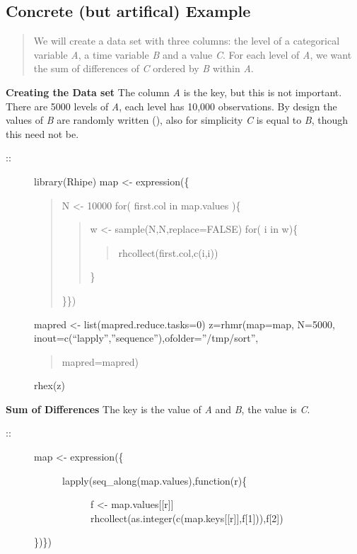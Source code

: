 \documentclass[letterpaper,10pt,english]{sphinxmanual}
\begin{document}
\subsection{Concrete (but artifical) Example}
\label{airline:concrete-but-artifical-example}\begin{quote}

We will create a data set with three columns: the level of a categorical variable \emph{A}, a time variable \emph{B} and a value \emph{C}. For each level of \emph{A}, we want the sum of differences of \emph{C} ordered by \emph{B} within \emph{A}.
\end{quote}

\textbf{Creating the Data set} The column \emph{A} is the key, but this is not important. There are 5000 levels of \emph{A}, each level has 10,000 observations. By design the values of \emph{B} are randomly written (), also for simplicity \emph{C} is equal to \emph{B}, though this need not be.
\begin{description}
\item[{::}] \leavevmode
library(Rhipe)
map \textless{}- expression(\{
\begin{quote}

N \textless{}- 10000
for( first.col in map.values )\{
\begin{quote}

w \textless{}- sample(N,N,replace=FALSE)
for( i in w)\{
\begin{quote}

rhcollect(first.col,c(i,i))
\end{quote}

\}
\end{quote}

\}\})
\end{quote}

mapred \textless{}- list(mapred.reduce.tasks=0)
z=rhmr(map=map, N=5000, inout=c(``lapply'',''sequence''),ofolder=''/tmp/sort'',
\begin{quote}

mapred=mapred)
\end{quote}

rhex(z)

\end{description}

\textbf{Sum of Differences}
The key is the value of \emph{A} and \emph{B}, the value is \emph{C}.
\begin{description}
\item[{::}] \leavevmode\begin{description}
\item[{map \textless{}- expression(\{}] \leavevmode\begin{description}
\item[{lapply(seq\_along(map.values),function(r)\{}] \leavevmode
f \textless{}- map.values{[}{[}r{]}{]}
rhcollect(as.integer(c(map.keys{[}{[}r{]}{]},f{[}1{]})),f{[}2{]})

\end{description}

\end{description}

\})\})

\end{description}
\end{document}
